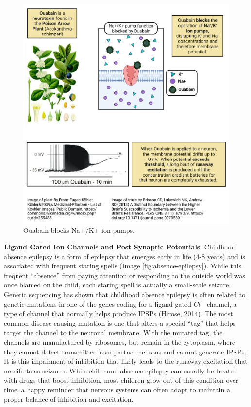 \documentclass[
]{book}
\begin{document}
\begin{figure}

{\centering \includegraphics[width=0.9\linewidth]{images/ch02/02_28} 

}

\caption{Ouabain blocks Na+/K+ ion pumps.}\label{fig:ouabain}
\end{figure}

\textbf{Ligand Gated Ion Channels and Post-Synaptic Potentials}. Childhood absence epilepsy is a form of epilepsy that emerges early in life (4-8 years) and is associated with frequent staring spells (Image \ref{fig:absence-epilepsy}). While this frequent ``absence'' from paying attention or responding to the outside world was once blamed on the child, each staring spell is actually a small-scale seizure. Genetic sequencing has shown that childhood absence epilepsy is often related to genetic mutations in one of the genes coding for a ligand-gated \(Cl^{-}\) channel, a type of channel that normally helps produce IPSPs (Hirose, 2014). The most common disease-causing mutation is one that alters a special ``tag'' that helps target the channel to the neuronal membrane. With the mutated tag, the channels are manufactured by ribosomes, but remain in the cytoplasm, where they cannot detect transmitter from partner neurons and cannot generate IPSPs. It is this impairment of inhibition that likely leads to the runaway excitation that manifests as seizures. While childhood absence epilepsy can usually be treated with drugs that boost inhibition, most children grow out of this condition over time, a happy reminder that nervous systems can often adapt to maintain a proper balance of inhibition and excitation.
\end{document}
